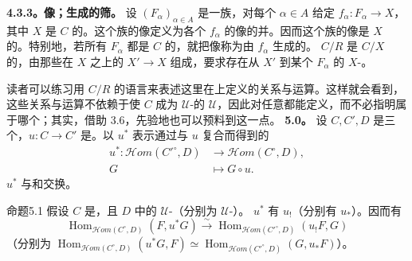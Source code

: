 \textbf{4.3.3。像；生成的筛。} 设 $(F_\alpha)_{\alpha\in A}$ 是一族，对每个 $\alpha\in A$ 给定 $f_\alpha:F_\alpha\to X$，其中 $X$ 是 $C$ 的。这个族的像定义为各个 $f_\alpha$ 的像的并。因而这个族的像是 $X$ 的。特别地，若所有 $F_\alpha$ 都是 $C$ 的，就把像称为由 $f_\alpha$ 生成的。 $C/R$ 是 $C/X$ 的，由那些在 $X$ 之上的 $X'\to X$ 组成，要求存在从 $X'$ 到某个 $F_\alpha$ 的 $X$-。

读者可以练习用 $C/R$ 的语言来表述这里在上定义的关系与运算。这样就会看到，这些关系与运算不依赖于使 $C$ 成为 $\mathcal U$-的 $\mathcal U$，因此对任意都能定义，而不必指明属于哪个；其实，借助 3.6，先验地也可以预料到这一点。
\textbf{5.0。} 设 $C,C',D$ 是三个，$u:C\to C'$ 是。以 $u^*$ 表示通过与 $u$ 复合而得到的
\[\begin{aligned}u^*:\mathcal H om(C'^\circ,D)&\longrightarrow\mathcal H om(C^\circ,D),\\G&\longmapsto G\circ u.\end{aligned}\]
 $u^*$ 与和交换。
\begin{SGAresult}{命题}{5.1}
假设 $C$ 是，且 $D$ 中的 $\mathcal U$-（分别为 $\mathcal U$-）。 $u^*$ 有 $u_!$（分别有 $u_*$）。因而有
\[\operatorname{Hom}_{\mathcal H om(C^\circ,D)}(F,u^*G)\xrightarrow{\sim}\operatorname{Hom}_{\mathcal H om(C'^\circ,D)}(u_!F,G)\]
（分别为 $\operatorname{Hom}_{\mathcal H om(C^\circ,D)}(u^*G,F)\simeq\operatorname{Hom}_{\mathcal H om(C'^\circ,D)}(G,u_*F)$）。
\end{SGAresult}
